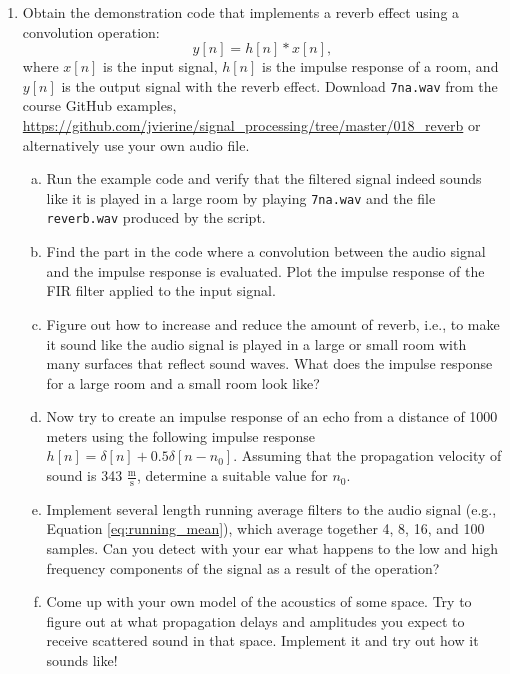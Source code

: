 \begin{enumerate}
  \item Obtain the demonstration code that implements a reverb effect
    using a convolution operation:
    \begin{equation}
      y[n]=h[n]*x[n],
      \end{equation}
    where $x[n]$ is the input signal, $h[n]$ is the impulse response
    of a room, and $y[n]$ is the output signal with the reverb
    effect. Download \verb|7na.wav| from the course GitHub examples,
    \url{https://github.com/jvierine/signal_processing/tree/master/018_reverb}
    or alternatively use your own audio file.

\begin{enumerate}[a)]

\item Run the example code and verify that the filtered signal indeed sounds like it
is played in a large room by playing \verb|7na.wav| and the file \verb|reverb.wav|
produced by the script.

\item Find the part in the code where a convolution between the audio
  signal and the impulse response is evaluated. Plot the impulse
  response of the FIR filter applied to the input signal.

\item Figure out how to increase and reduce the amount of reverb, i.e.,
to make it sound like the audio signal is played in a large or small
room with many surfaces that reflect sound waves. What does the
impulse response for a large room and a small room look like?

\item Now try to create an impulse response of an echo from a distance
  of 1000 meters using the following impulse response
  $h[n]=\delta[n]+0.5\delta[n-n_0]$. Assuming that the propagation velocity of
  sound is 343 $\frac{\mathrm{m}}{\mathrm{s}}$, determine a suitable value for $n_0$.

\item Implement several length running average filters to
  the audio signal (e.g., Equation \ref{eq:running_mean}), which
  average together 4, 8, 16, and 100 samples. Can you detect
  with your ear what happens to the low and high frequency components
  of the signal as a result of the operation?

\item Come up with your own model of the acoustics of some space. Try to figure
out at what propagation delays and amplitudes you expect to receive scattered sound
in that space. Implement it and try out how it sounds like!
\end{enumerate}


\end{enumerate}